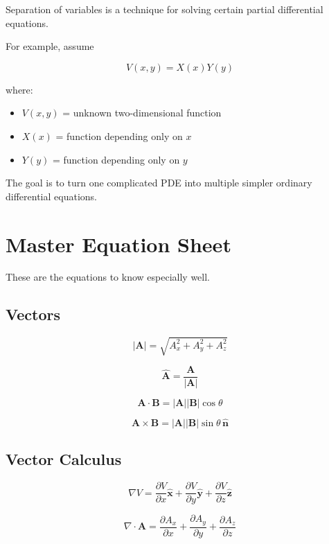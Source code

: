 \documentclass[11pt]{article}
\newcommand{\vect}[1]{\mathbf{#1}}
\newcommand{\uvect}[1]{\hat{\mathbf{#1}}}
\begin{document}
Separation of variables is a technique for solving certain partial differential equations.

For example, assume

\[
\boxed{
V(x,y)
=
X(x)Y(y)
}
\]

where:

\begin{itemize}
    \item $V(x,y)$ = unknown two-dimensional function
    \item $X(x)$ = function depending only on $x$
    \item $Y(y)$ = function depending only on $y$
\end{itemize}

The goal is to turn one complicated PDE into multiple simpler ordinary differential equations.



\section{Master Equation Sheet}

These are the equations to know especially well.

\subsection*{Vectors}

\[
\boxed{
|\vect{A}|
=
\sqrt{A_x^2+A_y^2+A_z^2}
}
\]

\[
\boxed{
\hat{\vect{A}}
=
\frac{\vect{A}}{|\vect{A}|}
}
\]

\[
\boxed{
\vect{A}\cdot\vect{B}
=
|\vect{A}||\vect{B}|\cos\theta
}
\]

\[
\boxed{
\vect{A}\times\vect{B}
=
|\vect{A}||\vect{B}|\sin\theta\,\hat{\vect{n}}
}
\]

\subsection*{Vector Calculus}

\[
\boxed{
\nabla V
=
\frac{\partial V}{\partial x}\uvect{x}
+
\frac{\partial V}{\partial y}\uvect{y}
+
\frac{\partial V}{\partial z}\uvect{z}
}
\]

\[
\boxed{
\nabla\cdot\vect{A}
=
\frac{\partial A_x}{\partial x}
+
\frac{\partial A_y}{\partial y}
+
\frac{\partial A_z}{\partial z}
}
\]
\end{document}
